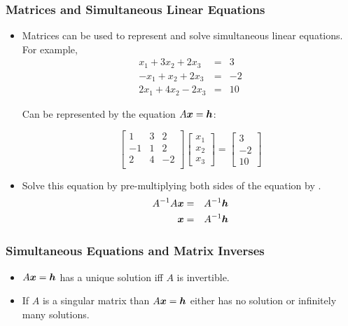 \documentclass{beamer}
\begin{document}
\begin{frame}
  \frametitle{Matrices and Simultaneous Linear Equations}

\begin{itemize}

\item Matrices can be used to represent and solve simultaneous linear equations. For example,
\begin{eqnarray*}
x_1 + 3x_2 + 2x_3 & = & 3\\
-x_1 + x_2 + 2x_3 & = & -2\\
2x_1 + 4x_2 -2x_3 & = & 10
\end{eqnarray*}

\medskip
Can be represented by the equation $A\bm{x} = \bm{h}$:

\[
\left[
\begin{array}{ccc}
1 & 3 & 2 \\
-1 & 1 & 2 \\
2 & 4 & -2 \\
\end{array}
\right]
\left[
\begin{array}{c}
x_1 \\ x_2 \\ x_3
\end{array}
\right]
=
\left[
\begin{array}{c}
3 \\ -2 \\ 10
\end{array}
\right]
\]


\item Solve this equation by pre-multiplying both sides of the equation by .
\begin{eqnarray*}
A^{-1} A \bm{x} & = &A^{-1} \bm{h} \\
\bm{x} & = &  A^{-1} \bm{h}
\end{eqnarray*}

\end{itemize}


\end{frame}

\begin{frame}
  \frametitle{Simultaneous Equations and Matrix Inverses}

\begin{itemize}
\item $A\bm{x} = \bm{h}$ has a unique solution iff $A$ is invertible.

\item If $A$ is a singular matrix than $A\bm{x} = \bm{h}$ either has no solution or infinitely many solutions.

\end{itemize}

\end{frame}
\end{document}
